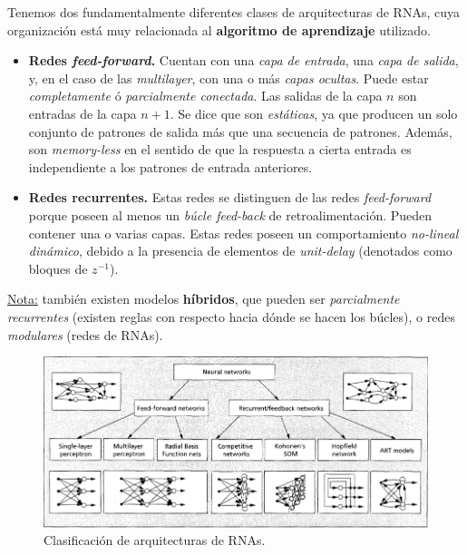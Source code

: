 \documentclass[10pt,a4paper]{article}
\begin{document}
Tenemos dos fundamentalmente diferentes clases de arquitecturas de RNAs, cuya organización está muy relacionada al \textbf{algoritmo de aprendizaje} utilizado.
\begin{itemize}
\item \textbf{Redes \textit{feed-forward}.} Cuentan con una \textit{capa de entrada}, una \textit{capa de salida}, y, en el caso de las \textit{multilayer}, con una o más \textit{capas ocultas}. Puede estar \textit{completamente} ó \textit{parcialmente conectada}. Las salidas de la capa $n$ son entradas de la capa $n+1$. Se dice que son \textit{estáticas}, ya que producen un solo conjunto de patrones de salida más que una secuencia de patrones. Además, son \textit{memory-less} en el sentido de que la respuesta a cierta entrada es independiente a los patrones de entrada anteriores.
\item \textbf{Redes recurrentes.} Estas redes se distinguen de las redes \textit{feed-forward} porque poseen al menos un \textit{búcle feed-back} de retroalimentación. Pueden contener una o varias capas. Estas redes poseen un comportamiento \textit{no-lineal dinámico}, debido a la presencia de elementos de \textit{unit-delay} (denotados como bloques de $z^{-1}$).
\end{itemize}

\underline{Nota:} también existen modelos \textbf{híbridos}, que pueden ser \textit{parcialmente recurrentes} (existen reglas con respecto hacia dónde se hacen los búcles), o redes \textit{modulares} (redes de RNAs).

\begin{figure}[ht!]
  \caption{Clasificación de arquitecturas de RNAs.}
  \label{fig:clasificacion}
  \centerline{\includegraphics[width=\textwidth-\fboxrule-\fboxrule]{imgs/clasificacion.png}}
\end{figure}

\end{document}
